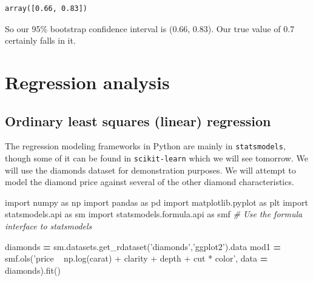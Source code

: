 \documentclass[
  letterpaper,
]{scrbook}
\newenvironment{Shaded}{\begin{snugshade}}{\end{snugshade}}
\newcommand{\CommentTok}[1]{\textcolor[rgb]{0.56,0.35,0.01}{\textit{#1}}}
\newcommand{\ImportTok}[1]{#1}
\newcommand{\NormalTok}[1]{#1}
\newcommand{\OperatorTok}[1]{\textcolor[rgb]{0.81,0.36,0.00}{\textbf{#1}}}
\newcommand{\StringTok}[1]{\textcolor[rgb]{0.31,0.60,0.02}{#1}}
\begin{document}
\begin{verbatim}
array([0.66, 0.83])
\end{verbatim}

So our 95\% bootstrap confidence interval is (0.66, 0.83). Our true value of 0.7 certainly falls in it.

\hypertarget{regression-analysis}{%
\section{Regression analysis}\label{regression-analysis}}

\hypertarget{ordinary-least-squares-linear-regression}{%
\subsection{Ordinary least squares (linear) regression}\label{ordinary-least-squares-linear-regression}}

The regression modeling frameworks in Python are mainly in \texttt{statsmodels}, though some of it can be found in \texttt{scikit-learn} which we will see tomorrow. We will use the diamonds dataset for demonstration purposes. We will attempt to model the diamond price against several of the other diamond characteristics.

\begin{Shaded}
\begin{Highlighting}[]
\ImportTok{import}\NormalTok{ numpy }\ImportTok{as}\NormalTok{ np}
\ImportTok{import}\NormalTok{ pandas }\ImportTok{as}\NormalTok{ pd}
\ImportTok{import}\NormalTok{ matplotlib.pyplot }\ImportTok{as}\NormalTok{ plt}
\ImportTok{import}\NormalTok{ statsmodels.api }\ImportTok{as}\NormalTok{ sm}
\ImportTok{import}\NormalTok{ statsmodels.formula.api }\ImportTok{as}\NormalTok{ smf }\CommentTok{# Use the formula interface to statsmodels}
\end{Highlighting}
\end{Shaded}

\begin{Shaded}
\begin{Highlighting}[]
\NormalTok{diamonds }\OperatorTok{=}\NormalTok{ sm.datasets.get_rdataset(}\StringTok{'diamonds'}\NormalTok{,}\StringTok{'ggplot2'}\NormalTok{).data}
\NormalTok{mod1 }\OperatorTok{=}\NormalTok{ smf.ols(}\StringTok{'price ~ np.log(carat) + clarity + depth + cut * color'}\NormalTok{, data }\OperatorTok{=}\NormalTok{ diamonds).fit()}
\end{Highlighting}
\end{Shaded}
\end{document}
